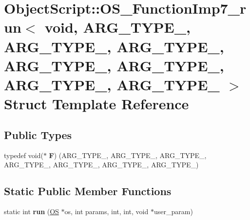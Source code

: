 \hypertarget{struct_object_script_1_1_o_s___function_imp7__run_3_01void_00_01_01_01_a_r_g___t_y_p_e__1_00_01_67bf3129786cbed8764589892c1e2720}{}\section{Object\+Script\+:\+:O\+S\+\_\+\+Function\+Imp7\+\_\+run$<$ void, A\+R\+G\+\_\+\+T\+Y\+P\+E\+\_, A\+R\+G\+\_\+\+T\+Y\+P\+E\+\_, A\+R\+G\+\_\+\+T\+Y\+P\+E\+\_, A\+R\+G\+\_\+\+T\+Y\+P\+E\+\_, A\+R\+G\+\_\+\+T\+Y\+P\+E\+\_, A\+R\+G\+\_\+\+T\+Y\+P\+E\+\_, A\+R\+G\+\_\+\+T\+Y\+P\+E\+\_ $>$ Struct Template Reference}
\label{struct_object_script_1_1_o_s___function_imp7__run_3_01void_00_01_01_01_a_r_g___t_y_p_e__1_00_01_67bf3129786cbed8764589892c1e2720}
\subsection*{Public Types}
\begin{DoxyCompactItemize}
\item 
typedef void($\ast$ {\bfseries F}) (A\+R\+G\+\_\+\+T\+Y\+P\+E\+\_, A\+R\+G\+\_\+\+T\+Y\+P\+E\+\_, A\+R\+G\+\_\+\+T\+Y\+P\+E\+\_, A\+R\+G\+\_\+\+T\+Y\+P\+E\+\_, A\+R\+G\+\_\+\+T\+Y\+P\+E\+\_, A\+R\+G\+\_\+\+T\+Y\+P\+E\+\_, A\+R\+G\+\_\+\+T\+Y\+P\+E\+\_)\hypertarget{struct_object_script_1_1_o_s___function_imp7__run_3_01void_00_01_01_01_a_r_g___t_y_p_e__1_00_01_67bf3129786cbed8764589892c1e2720_a02b619f00702a822436754ea7a214599}{}\label{struct_object_script_1_1_o_s___function_imp7__run_3_01void_00_01_01_01_a_r_g___t_y_p_e__1_00_01_67bf3129786cbed8764589892c1e2720_a02b619f00702a822436754ea7a214599}

\end{DoxyCompactItemize}
\subsection*{Static Public Member Functions}
\begin{DoxyCompactItemize}
\item 
static int {\bfseries run} (\hyperlink{class_object_script_1_1_o_s}{OS} $\ast$os, int params, int, int, void $\ast$user\+\_\+param)\hypertarget{struct_object_script_1_1_o_s___function_imp7__run_3_01void_00_01_01_01_a_r_g___t_y_p_e__1_00_01_67bf3129786cbed8764589892c1e2720_ae992f0a2934c222bf20bde198b867f6e}{}\label{struct_object_script_1_1_o_s___function_imp7__run_3_01void_00_01_01_01_a_r_g___t_y_p_e__1_00_01_67bf3129786cbed8764589892c1e2720_ae992f0a2934c222bf20bde198b867f6e}

\end{DoxyCompactItemize}


